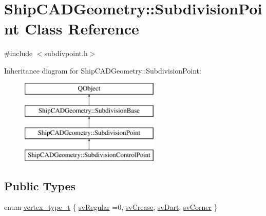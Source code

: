 \hypertarget{classShipCADGeometry_1_1SubdivisionPoint}{\section{Ship\-C\-A\-D\-Geometry\-:\-:Subdivision\-Point Class Reference}
\label{classShipCADGeometry_1_1SubdivisionPoint}
}


{\ttfamily \#include $<$subdivpoint.\-h$>$}

Inheritance diagram for Ship\-C\-A\-D\-Geometry\-:\-:Subdivision\-Point\-:\begin{figure}[H]
\begin{center}
\leavevmode
\includegraphics[height=4.000000cm]{classShipCADGeometry_1_1SubdivisionPoint}
\end{center}
\end{figure}
\subsection*{Public Types}
\begin{DoxyCompactItemize}
\item 
enum \hyperlink{classShipCADGeometry_1_1SubdivisionPoint_a03df9289cd8543cd3a567fa6c8e44c43}{vertex\-\_\-type\-\_\-t} \{ \hyperlink{classShipCADGeometry_1_1SubdivisionPoint_a03df9289cd8543cd3a567fa6c8e44c43a30dab596d2a968d283f161c490768ab0}{sv\-Regular} =0, 
\hyperlink{classShipCADGeometry_1_1SubdivisionPoint_a03df9289cd8543cd3a567fa6c8e44c43a7724ab9a0642a0ad21a896fb61a38035}{sv\-Crease}, 
\hyperlink{classShipCADGeometry_1_1SubdivisionPoint_a03df9289cd8543cd3a567fa6c8e44c43a94b87414422f77b76ecdbfadf29b985c}{sv\-Dart}, 
\hyperlink{classShipCADGeometry_1_1SubdivisionPoint_a03df9289cd8543cd3a567fa6c8e44c43adaf8032ead1bd79e03cff882b7b3987f}{sv\-Corner}
 \}
\end{DoxyCompactItemize}
